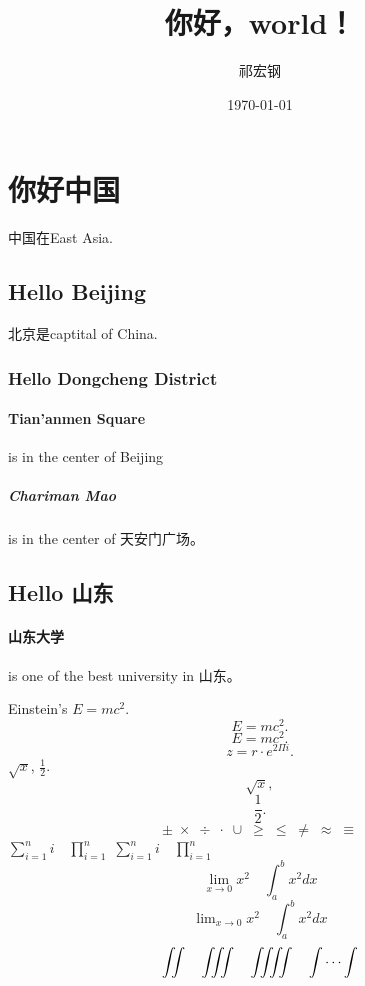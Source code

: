 \documentclass[UTF8]{ctexart}
\title{你好，world！}
\author{祁宏钢}
\date{\today}
\begin{document}
\tableofcontents
\maketitle
\section{你好中国}
中国在East Asia.
\subsection{Hello Beijing}
北京是captital of China.
\subsubsection{Hello Dongcheng District}
\paragraph{Tian'anmen Square}
is in the center of Beijing
\subparagraph{Chariman Mao}
is in the center of 天安门广场。
\subsection{Hello 山东}
\paragraph{山东大学} is one of the best university in 山东。

Einstein's $E=mc^2$.
\[ E=mc^2. \]
\begin{equation}
    E=mc^2.
\end{equation}
\[z = r\cdot e^{2\Pi i}.\]
$\sqrt{x}$, $\frac{1}{2}$.
\[ \sqrt{x}, \]
\[ \frac{1}{2}. \]
\[ \pm\; \times \; \div\; \cdot\; \cup\;
\geq\; \leq\; \neq\; \approx \; \equiv  \]
$ \sum_{i=1}^n i\quad \prod_{i=1}^n $
$ \sum\limits _{i=1}^n i\quad \prod\limits _{i=1}^n $
\[ \lim_{x\to0}x^2 \quad \int_a^b x^2 dx \]
\[ \lim\nolimits _{x\to0}x^2\quad \int\nolimits_a^b x^2 dx \]
\[ \iint\quad \iiint\quad \iiiint\quad \idotsint \]
\end{document}
